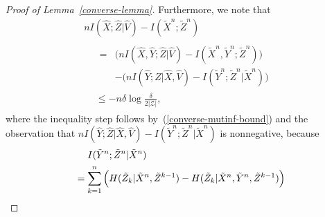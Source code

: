 \documentclass[journal]{IEEEtran}
\newcommand{\lemmaconst}{\delta}
\newcommand{\channelInOne}{X}
\newcommand{\channelInTwo}{Y}
\newcommand{\channelOut}{Z}
\newcommand{\channelOutAlph}{\mathcal{Z}}
\newcommand{\codebookBlocklength}{n}
\newcommand{\blockIndex}{k}
\newcommand{\mutualInformation}[2]{I(#1;#2)}
\newcommand{\mutualInformationConditional}[3]{I(#1;#2|#3)}
\newcommand{\entropyConditional}[2]{H(#1 | #2)}
\newcommand{\cardinality}[1]{\lvert #1 \rvert}
\newcommand{\timeSharingRV}{V}
\begin{document}
\begin{proof}[Proof of Lemma~\ref{converse-lemma}]
Furthermore, we note that
\begin{multline}
\codebookBlocklength
\mutualInformationConditional{\hat{\channelInOne}}{\hat{\channelOut}}{\hat{\timeSharingRV}}
-
\mutualInformation{\tilde{\channelInOne}^\codebookBlocklength}{\tilde{\channelOut}^\codebookBlocklength}
\\
\begin{aligned}
&
\begin{aligned}
=
&
\big(
  \codebookBlocklength
  \mutualInformationConditional{\hat{\channelInOne}, \hat{\channelInTwo}}{\hat{\channelOut}}{\hat{\timeSharingRV}}
  -
  \mutualInformation{\tilde{\channelInOne}^\codebookBlocklength, \tilde{\channelInTwo}^\codebookBlocklength}{\tilde{\channelOut}^\codebookBlocklength}
\big)
\\
&-
\big(
  \codebookBlocklength
  \mutualInformationConditional{\hat{\channelInTwo}}{\hat{\channelOut}}{\hat{\channelInOne}, \hat{\timeSharingRV}}
  -
  \mutualInformationConditional{\tilde{\channelInTwo}^\codebookBlocklength}{\tilde{\channelOut}^\codebookBlocklength}{\tilde{\channelInOne}^\codebookBlocklength}
\big)
\end{aligned}
\\
&\leq
-
\codebookBlocklength
\lemmaconst
\log
\frac{\lemmaconst}{2\cardinality{\channelOutAlph}},
\end{aligned}
\label{converse-lemma-rateone-bound-prereq}
\end{multline}
where the inequality step follows by~(\ref{converse-mutinf-bound}) and the observation that
$
  \codebookBlocklength
  \mutualInformationConditional{\hat{\channelInTwo}}{\hat{\channelOut}}{\hat{\channelInOne}, \hat{\timeSharingRV}}
  -
  \mutualInformationConditional{\tilde{\channelInTwo}^\codebookBlocklength}{\tilde{\channelOut}^\codebookBlocklength}{\tilde{\channelInOne}^\codebookBlocklength}
$
is nonnegative, because
\begin{align}
&\hphantom{{}={}}
\mutualInformationConditional{\tilde{\channelInTwo}^\codebookBlocklength}{\tilde{\channelOut}^\codebookBlocklength}{\tilde{\channelInOne}^\codebookBlocklength}
\nonumber
\\
&=
\sum_{\blockIndex=1}^\codebookBlocklength
  \Big(
    \entropyConditional{\tilde{\channelOut}_\blockIndex}{\tilde{\channelInOne}^\codebookBlocklength, \tilde{\channelOut}^{\blockIndex-1}}
    -
    \entropyConditional{\tilde{\channelOut}_\blockIndex}{\tilde{\channelInOne}^\codebookBlocklength, \tilde{\channelInTwo}^\codebookBlocklength, \tilde{\channelOut}^{\blockIndex-1}}
  \Big)
\label{converse-lemma-rateone-ibound-chain-rule}

\end{align}
\end{proof}
\end{document}
